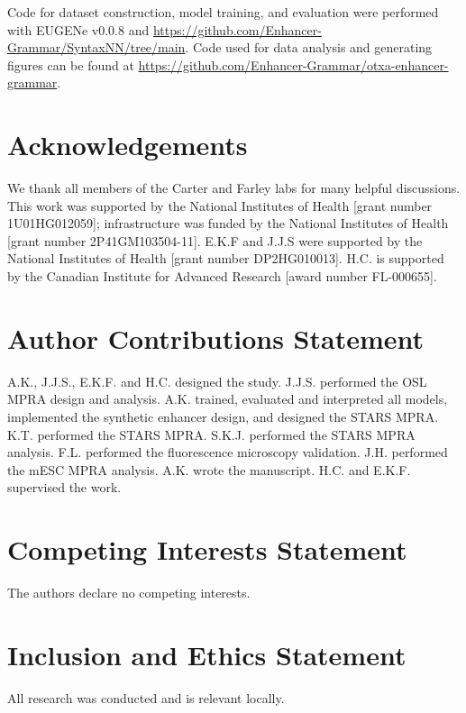 Code for dataset construction, model training, and evaluation were performed with EUGENe v0.0.8 \cite{Klie2023-yr} and \url{https://github.com/Enhancer-Grammar/SyntaxNN/tree/main}. Code used for data analysis and generating figures can be found at \url{https://github.com/Enhancer-Grammar/otxa-enhancer-grammar}.

\section{Acknowledgements}

We thank all members of the Carter and Farley labs for many helpful discussions. This work was supported by the National Institutes of Health [grant number 1U01HG012059]; infrastructure was funded by the National Institutes of Health [grant number 2P41GM103504-11]. E.K.F and J.J.S were supported by the National Institutes of Health [grant number DP2HG010013]. H.C. is supported by the Canadian Institute for Advanced Research [award number FL-000655].

\section{Author Contributions Statement}

A.K., J.J.S., E.K.F. and H.C. designed the study. J.J.S. performed the OSL MPRA design and analysis. A.K. trained, evaluated and interpreted all models, implemented the synthetic enhancer design, and designed the STARS MPRA. K.T. performed the STARS MPRA. S.K.J. performed the STARS MPRA analysis. F.L. performed the fluorescence microscopy validation. J.H. performed the mESC MPRA analysis. A.K. wrote the manuscript. H.C. and E.K.F. supervised the work.

\section{Competing Interests Statement}

The authors declare no competing interests.

\section{Inclusion and Ethics Statement}

All research was conducted and is relevant locally.
